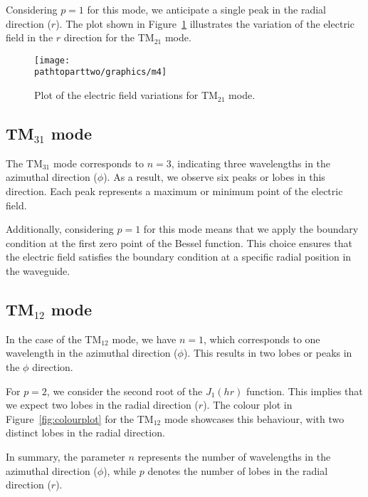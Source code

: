 Considering $p=1$ for this mode, we anticipate a single peak in the radial direction ($r$). The plot shown in Figure~\ref{fig:m4} illustrates the variation of the electric field in the $r$ direction for the TM$_{21}$ mode.
\begin{figure}[h]
\centering
\texttt{[image: \\pathtoparttwo/graphics/m4]}
\caption{Plot of the electric field variations for TM$_{21}$ mode.}
\label{fig:m4}
\end{figure}

\subsection{TM$_{31}$ mode}
The TM$_{31}$ mode corresponds to $n=3$, indicating three wavelengths in the azimuthal direction ($\phi$). As a result, we observe six peaks or lobes in this direction. Each peak represents a maximum or minimum point of the electric field.

Additionally, considering $p=1$ for this mode means that we apply the boundary condition at the first zero point of the Bessel function. This choice ensures that the electric field satisfies the boundary condition at a specific radial position in the waveguide.

\subsection{TM$_{12}$ mode}
In the case of the TM$_{12}$ mode, we have $n=1$, which corresponds to one wavelength in the azimuthal direction ($\phi$). This results in two lobes or peaks in the $\phi$ direction.

For $p=2$, we consider the second root of the $J_1(hr)$ function. This implies that we expect two lobes in the radial direction ($r$). The colour plot in Figure~\ref{fig:colourplot} for the TM$_{12}$ mode showcases this behaviour, with two distinct lobes in the radial direction.

In summary, the parameter $n$ represents the number of wavelengths in the azimuthal direction ($\phi$), while $p$ denotes the number of lobes in the radial direction ($r$).
   
